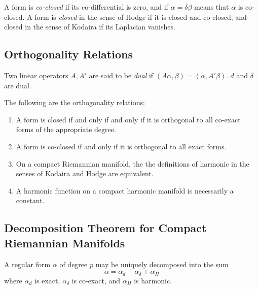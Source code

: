 \begin{defn}

A form is \textit{co-closed} if its co-differential is zero, and if $ \alpha = \delta \beta$ means that $ \alpha$ is co-closed. A form is \textit{closed} in the sense of Hodge if it is closed and co-closed, and closed in the sense of Kodaira if its Laplacian vanishes.

\end{defn}

\subsection{Orthogonality Relations}

\begin{defn}

	Two linear operators $A, A'$ are said to be \textit{dual} if $ \left( A \alpha, \beta \right) = \left( \alpha, A' \beta \right)$. $d$ and $ \delta$ are dual.

\end{defn}

\begin{prop}

The following are the orthogonality relations:
\begin{enumerate}
	\item A form is closed if and only if and only if it is orthogonal to all co-exact forms of the appropriate degree.
	\item A form is co-closed if and only if it is orthogonal to all exact forms.
	\item On a compact Riemannian manifold, the the definitions of harmonic in the senses of Kodaira and Hodge are equivalent.
	\item A harmonic function on a compact harmonic manifold is necessarily a constant.
\end{enumerate}

\end{prop}

\subsection{Decomposition Theorem for Compact Riemannian Manifolds}

\begin{thm}

A regular form $ \alpha$ of degree $p$ may be uniquely decomposed into the sum
\[
\alpha = \alpha_d + \alpha_{ \delta } + \alpha_H
\]
where $ \alpha_d$ is exact, $ \alpha_{ \delta }$ is co-exact, and $ \alpha_H$ is harmonic.

\end{thm}

